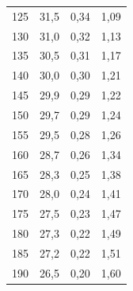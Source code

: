 \documentclass{article}
\begin{document}
\begin{tabular}{cccc}
	125            & 31,5                         & 0,34                                                                 & 1,09     \\
	130            & 31,0                         & 0,32                                                                 & 1,13     \\
	135            & 30,5                         & 0,31                                                                 & 1,17     \\
	140            & 30,0                         & 0,30                                                                 & 1,21     \\
	145            & 29,9                         & 0,29                                                                 & 1,22     \\
	150            & 29,7                         & 0,29                                                                 & 1,24     \\
	155            & 29,5                         & 0,28                                                                 & 1,26     \\
	160            & 28,7                         & 0,26                                                                 & 1,34     \\
	165            & 28,3                         & 0,25                                                                 & 1,38     \\
	170            & 28,0                         & 0,24                                                                 & 1,41     \\
	175            & 27,5                         & 0,23                                                                 & 1,47     \\
	180            & 27,3                         & 0,22                                                                 & 1,49     \\
	185            & 27,2                         & 0,22                                                                 & 1,51     \\
	190            & 26,5                         & 0,20                                                                 & 1,60 
\end{tabular}
\end{document}
